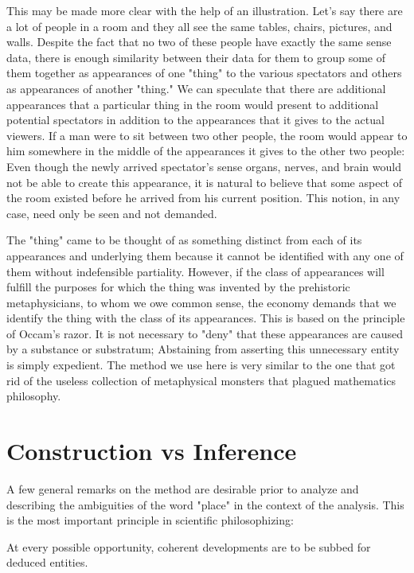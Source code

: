 \documentclass[a4paper,12pt]{book}[2004/02/16]
\theoremstyle{ilemma}
\theoremstyle{itheorem}
\theoremstyle{iother}
\theoremstyle{icorollary}
\theoremstyle{numcorollary}
\theoremstyle{idefinition}
\begin{document}
This may be made more clear with the help of an illustration. Let's say there are a lot of people in a room and they all see the same tables, chairs, pictures, and walls. Despite the fact that no two of these people have exactly the same sense data, there is enough similarity between their data for them to group some of them together as appearances of one "thing" to the various spectators and others as appearances of another "thing."
We can speculate that there are additional appearances that a particular thing in the room would present to additional potential spectators in addition to the appearances that it gives to the actual viewers. If a man were to sit between two other people, the room would appear to him somewhere in the middle of the appearances it gives to the other two people: Even though the newly arrived spectator's sense organs, nerves, and brain would not be able to create this appearance, it is natural to believe that some aspect of the room existed before he arrived from his current position. This notion, in any case, need
only be seen and not demanded.

The "thing" came to be thought of as something distinct from each of its appearances and underlying them because it cannot be identified with any one of them without indefensible partiality.
However, if the class of appearances will fulfill the purposes for which the thing was invented by the prehistoric metaphysicians, to whom we owe common sense, the economy demands that we identify the thing with the class of its appearances. This is based on the principle of Occam's razor. It is not necessary to "deny" that these appearances are caused by a substance or substratum; Abstaining from asserting this unnecessary entity is simply expedient. The method we use here is very similar to the one that got rid of the useless collection of metaphysical monsters that plagued mathematics philosophy.

\section{Construction vs Inference}
A few general remarks on the method are desirable prior to analyze and describing the ambiguities of the word "place" in the context of the analysis. This is the most important principle in scientific philosophizing:

  At every possible opportunity, coherent developments are to be subbed
  for deduced entities.
\end{document}
